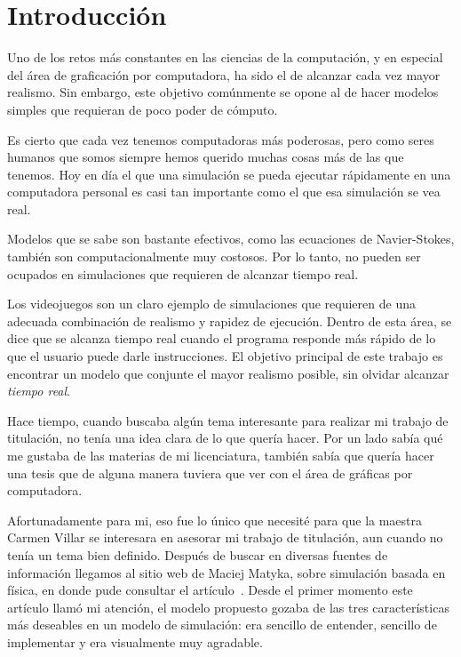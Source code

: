 \chapter*{Introducción}

Uno de los retos más constantes en las ciencias de la computación, y en especial del área de graficación por computadora, ha sido el de alcanzar cada vez mayor realismo.
Sin embargo, este objetivo comúnmente se opone al de hacer modelos simples que requieran de poco poder de cómputo.

Es cierto que cada vez tenemos computadoras más poderosas, pero como seres humanos que somos siempre hemos querido muchas cosas más de las que tenemos.
Hoy en día el que una simulación se pueda ejecutar rápidamente en una computadora personal es casi tan importante como el que esa simulación se vea real.

Modelos que se sabe son bastante efectivos, como las ecuaciones de Navier-Stokes, también son computacionalmente muy costosos.
Por lo tanto, no pueden ser ocupados en simulaciones que requieren de alcanzar tiempo real.

Los videojuegos son un claro ejemplo de simulaciones que requieren de una adecuada combinación de realismo y rapidez de ejecución.
Dentro de esta área, se dice que se alcanza tiempo real cuando el programa responde más rápido de lo que el usuario puede darle instrucciones.
El objetivo principal de este trabajo es encontrar un modelo que conjunte el mayor realismo posible, sin olvidar alcanzar \emph{tiempo real}.

Hace tiempo, cuando buscaba algún tema interesante para realizar mi trabajo de titulación, no tenía una idea clara de lo que quería hacer.
Por un lado sabía qué me gustaba de las materias de mi licenciatura, también sabía que quería hacer una tesis que de alguna manera tuviera que ver con el área de gráficas por computadora.

Afortunadamente para mi, eso fue lo único que necesité para que la maestra Carmen Villar se interesara en asesorar mi trabajo de titulación, aun cuando no tenía un tema bien definido.
Después de buscar en diversas fuentes de información llegamos al sitio web de Maciej Matyka, sobre simulación basada en física, en donde pude consultar el artículo~\cite{Matyka:Presion}.
Desde el primer momento este artículo llamó  mi atención, el modelo propuesto gozaba de las tres características más deseables en un modelo de simulación: era sencillo de entender, sencillo de implementar y era visualmente muy agradable.


